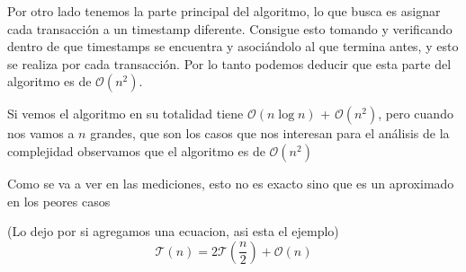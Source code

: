 Por otro lado tenemos la parte principal del algoritmo, lo que busca es asignar cada transacción a un timestamp diferente. Consigue esto tomando y verificando dentro de que timestamps se encuentra y asociándolo al que termina antes, y esto se realiza por cada transacción. Por lo tanto podemos deducir que esta parte del algoritmo es de $\mathcal{O}(n^2)$.

Si vemos el algoritmo en su totalidad tiene $\mathcal{O}\left(n \log n\right)$ + $\mathcal{O}(n^2)$, pero cuando nos vamos a $n$ grandes, que son los casos que nos interesan para el análisis de la complejidad observamos que el algoritmo es de $\mathcal{O}(n^2)$

Como se va a ver en las mediciones, esto no es exacto sino que es un aproximado en los peores casos

(Lo dejo por si agregamos una ecuacion, asi esta el ejemplo)
\begin{equation*} %
    \mathcal{T}(n) = 2 \mathcal{T}\left(\frac{n}{2}\right) + \mathcal{O}(n)
\end{equation*}

